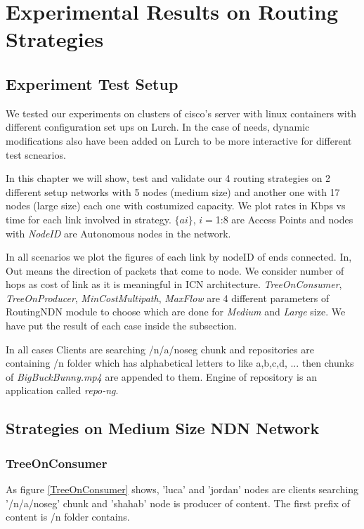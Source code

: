 
\chapter{Experimental Results on Routing Strategies} %

\label{expereince}


\section{Experiment Test Setup}
We tested our experiments on clusters of cisco's server with linux containers with different configuration set ups on Lurch. In the case of needs, dynamic modifications also have been added on Lurch to be more interactive for different test scnearios.

In this chapter we will show, test and validate our 4 routing strategies on 2 different setup networks with 5 nodes (medium size) and another one with 17 nodes (large size) each one with costumized capacity. We plot rates in Kbps vs time for each link involved in strategy. $\{ai\}$, $i=$1:8 are Access Points and nodes with \textit{NodeID} are Autonomous nodes in the network.
   
In all scenarios we plot the figures of each link by nodeID of ends connected. In, Out means the direction of packets that come to node. We consider number of hops as cost of link as it is meaningful in ICN architecture.
\textit{TreeOnConsumer}, \textit{TreeOnProducer}, \textit{MinCostMultipath}, \textit{MaxFlow} are 4 different parameters of RoutingNDN module to choose which are done for \textit{Medium} and \textit{Large} size. We have put the result of each case inside the subsection.

In all cases Clients are searching /n/a/noseg chunk and repositories are containing /n folder which has alphabetical letters to like a,b,c,d, ... then chunks of \textit{BigBuckBunny.mp4} are appended to them. Engine of repository is an application called \textit{repo-ng}. 

\section{Strategies on Medium Size NDN Network}


\subsection{TreeOnConsumer}
As figure \ref{TreeOnConsumer} shows, 'luca' and 'jordan' nodes are clients searching '/n/a/noseg' chunk and 'shahab' node is producer of content. The first prefix of content is /n folder contains.

